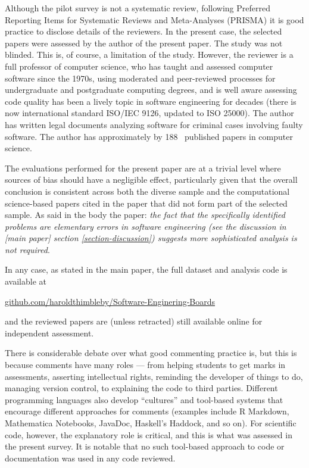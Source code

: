 \documentclass[10pt,a4paper]{article}
\begin{document}
\begin{change}
Although the pilot survey is not a systematic review, following Preferred Reporting Items for Systematic Reviews and Meta-Analyses (PRISMA) \cite{prisma} it is good practice to disclose details of the reviewers. In the present case, the selected papers were assessed by the author of the present paper. The study was not blinded. This is, of course, a limitation of the study. However, the reviewer is a full professor of computer science, who has taught and assessed computer software since the 1970s, using moderated and peer-reviewed processes for undergraduate and postgraduate computing degrees, and is well aware assessing code quality has been a lively topic in software engineering for decades (there is now international standard ISO/IEC 9126, updated to ISO 25000). The author has written legal documents analyzing software for criminal cases involving faulty software. The author has approximately 
\newcount \papers {} %
\advance \papers by 188 %
\the\papers\ published papers in computer science. 

The evaluations performed for the present paper are at a trivial level where sources of bias should have a negligible effect, particularly given that the overall conclusion is consistent across both the diverse sample and the computational science-based papers cited in the paper that did not form part of the selected sample. As said in the body the paper: \emph{the fact that the specifically identified problems are elementary errors in software engineering (see the discussion in \emph{[main paper]\/} section \ref{section-discussion}) suggests more sophisticated analysis is not required}. 

In any case, as stated in the main paper, the full dataset and analysis code is available at \begin{center}\url{github.com/haroldthimbleby/Software-Enginering-Boards}\end{center} and the reviewed papers are (unless retracted) still available online for independent assessment. %
\end{change}

There is considerable debate over what good commenting practice is, but this is because comments have many roles --- from helping students to get marks in assessments, asserting intellectual rights, reminding the developer of things to do, managing version control, to explaining the code to third parties. Different programming languages also develop ``cultures'' and tool-based systems that encourage different approaches for comments (examples include R Markdown, Mathematica Notebooks, JavaDoc, Haskell's Haddock, and so on). For scientific code, however, the explanatory role is critical, and this is what was assessed in the present survey. It is notable that no such tool-based approach to code or documentation was used in any code reviewed.
\end{document}
